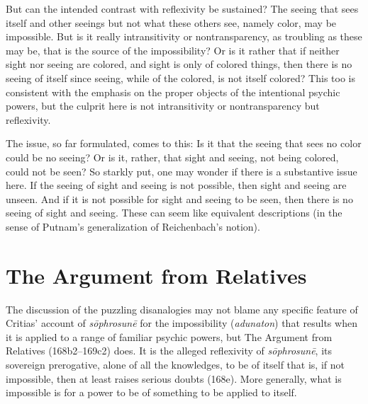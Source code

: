 But can the intended contrast with reflexivity be sustained? The seeing that sees itself and other seeings but not what these others see, namely color, may be impossible. But is it really intransitivity or nontransparency, as troubling as these may be, that is the source of the impossibility? Or is it rather that if neither sight nor seeing are colored, and sight is only of colored things, then there is no seeing of itself since seeing, while of the colored, is not itself colored? This too is consistent with the emphasis on the proper objects of the intentional psychic powers, but the culprit here is not intransitivity or nontransparency but reflexivity.

The issue, so far formulated, comes to this: Is it that the seeing that sees no color could be no seeing? Or is it, rather, that sight and seeing, not being colored, could not be seen? So starkly put, one may wonder if there is a substantive issue here. If the seeing of sight and seeing is not possible, then sight and seeing are unseen. And if it is not possible for sight and seeing to be seen, then there is no seeing of sight and seeing. These can seem like equivalent descriptions (in the sense of Putnam's generalization of Reichenbach's notion).








\section{The Argument from Relatives} %
\label{sec:the_argument_from_relatives}

The discussion of the puzzling disanalogies may not blame any specific feature of Critias' account of \emph{sōphrosunē} for the impossibility (\emph{adunaton}) that results when it is applied to a range of familiar psychic powers, but The Argument from Relatives (168b2–169c2) does. It is the alleged reflexivity of \emph{sōphrosunē}, its sovereign prerogative, alone of all the knowledges, to be of itself that is, if not impossible, then at least raises serious doubts (168e). More generally, what is impossible is for a power to be of something to be applied to itself.

